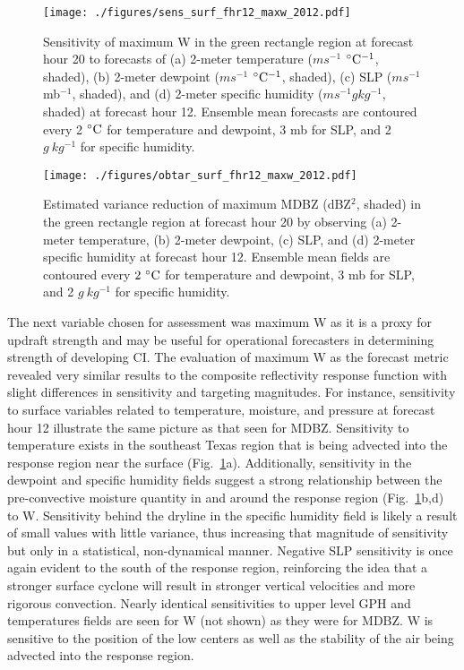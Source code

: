 \documentclass{ttuthes2007}
\newcommand{\tab}{\hspace*{2em}}  %
\begin{document}
\begin{figure}[!tb]
  \centering
  \noindent\texttt{[image: ./figures/sens\_surf\_fhr12\_maxw\_2012.pdf]}\\
  \caption{Sensitivity of maximum W in the green rectangle region at forecast hour 20 to forecasts of (a) 2-meter temperature ($m s^{-1}$ ${}^{\circ} {\rm C^{-1}}$, shaded), (b) 2-meter dewpoint ($m s^{-1}$ ${}^{\circ} {\rm C^{-1}}$, shaded), (c) SLP ($m s^{-1}$ mb${}^{-1}$, shaded), and (d) 2-meter specific humidity ($m s^{-1} g kg^{-1}$, shaded) at forecast hour 12. Ensemble mean forecasts are contoured every 2 ${}^{\circ} {\rm C}$ for temperature and dewpoint, 3 mb for SLP, and 2 $g~kg^{-1}$ for specific humidity.}
\label{sens_surf_fhr12_maxw_2012}
\end{figure}

\begin{figure}[!tb]
  \centering
  \noindent\texttt{[image: ./figures/obtar\_surf\_fhr12\_maxw\_2012.pdf]}\\
  \caption{Estimated variance reduction of maximum MDBZ (dBZ${}^2$, shaded) in the green rectangle region at forecast hour 20 by observing (a) 2-meter temperature, (b) 2-meter dewpoint, (c) SLP, and (d) 2-meter specific humidity at forecast hour 12. Ensemble mean fields are contoured every $2^{~\circ} {\rm C}$ for temperature and dewpoint, 3 mb for SLP, and 2 $g~kg^{-1}$ for specific humidity.}
\label{obtar_surf_fhr12_maxw_2012}
\end{figure}


\tab The next variable chosen for assessment was maximum W as it is a proxy for updraft strength and may be useful for operational forecasters in determining strength of developing CI. The evaluation of maximum W as the forecast metric revealed very similar results to the composite reflectivity response function with slight differences in sensitivity and targeting magnitudes. For instance, sensitivity to surface variables related to temperature, moisture, and pressure at forecast hour 12 illustrate the same picture as that seen for MDBZ. Sensitivity to temperature exists in the southeast Texas region that is being advected into the response region near the surface (Fig.~\ref{sens_surf_fhr12_maxw_2012}a). Additionally, sensitivity in the dewpoint and specific humidity fields suggest a strong relationship between the pre-convective moisture quantity in and around the response region (Fig.~\ref{sens_surf_fhr12_maxw_2012}b,d) to W. Sensitivity behind the dryline in the specific humidity field is likely a result of small values with little variance, thus increasing that magnitude of sensitivity but only in a statistical, non-dynamical manner. Negative SLP sensitivity is once again evident to the south of the response region, reinforcing the idea that a stronger surface cyclone will result in stronger vertical velocities and more rigorous convection. Nearly identical sensitivities to upper level GPH and temperatures fields are seen for W (not shown) as they were for MDBZ. W is sensitive to the position of the low centers as well as the stability of the air being advected into the response region. 
\end{document}
